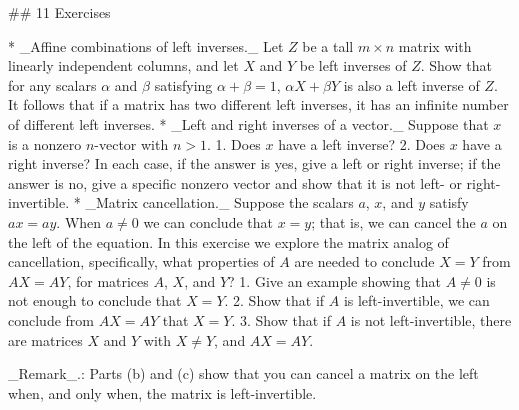 

## 11 Exercises

* _Affine combinations of left inverses._ Let \(Z\) be a tall \(m\times n\) matrix with linearly independent columns, and let \(X\) and \(Y\) be left inverses of \(Z\). Show that for any scalars \(\alpha\) and \(\beta\) satisfying \(\alpha+\beta=1\), \(\alpha X+\beta Y\) is also a left inverse of \(Z\). It follows that if a matrix has two different left inverses, it has an infinite number of different left inverses.
* _Left and right inverses of a vector._ Suppose that \(x\) is a nonzero \(n\)-vector with \(n>1\). 1. Does \(x\) have a left inverse? 2. Does \(x\) have a right inverse? In each case, if the answer is yes, give a left or right inverse; if the answer is no, give a specific nonzero vector and show that it is not left- or right-invertible.
* _Matrix cancellation._ Suppose the scalars \(a\), \(x\), and \(y\) satisfy \(ax=ay\). When \(a\neq 0\) we can conclude that \(x=y\); that is, we can cancel the \(a\) on the left of the equation. In this exercise we explore the matrix analog of cancellation, specifically, what properties of \(A\) are needed to conclude \(X=Y\) from \(AX=AY\), for matrices \(A\), \(X\), and \(Y\)? 1. Give an example showing that \(A\neq 0\) is not enough to conclude that \(X=Y\). 2. Show that if \(A\) is left-invertible, we can conclude from \(AX=AY\) that \(X=Y\). 3. Show that if \(A\) is not left-invertible, there are matrices \(X\) and \(Y\) with \(X\neq Y\), and \(AX=AY\).

_Remark_.: Parts (b) and (c) show that you can cancel a matrix on the left when, and only when, the matrix is left-invertible.

